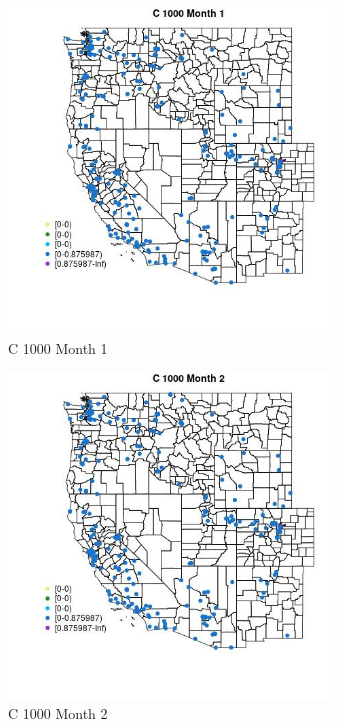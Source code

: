 \begin{figure} 
\centering  
\includegraphics[width=0.77\textwidth]{Code_Outputs/Report_ML_input_PM25_Step4_part_e_de_duplicated_aveswNAs_MapObsMo1C_1000.jpg} 
\caption{\label{fig:Report_ML_input_PM25_Step4_part_e_de_duplicated_aveswNAsMapObsMo1C_1000}C 1000 Month 1} 
\end{figure} 
 

\begin{figure} 
\centering  
\includegraphics[width=0.77\textwidth]{Code_Outputs/Report_ML_input_PM25_Step4_part_e_de_duplicated_aveswNAs_MapObsMo2C_1000.jpg} 
\caption{\label{fig:Report_ML_input_PM25_Step4_part_e_de_duplicated_aveswNAsMapObsMo2C_1000}C 1000 Month 2} 
\end{figure} 
 

